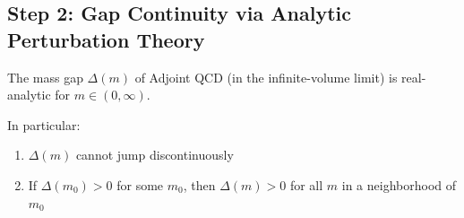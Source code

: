 \subsection{Step 2: Gap Continuity via Analytic Perturbation Theory}
\label{subsec:roadmap3-step2}

\begin{theorem}
\label{thm:gap-analytic-app90}
The mass gap $\Delta(m)$ of Adjoint QCD (in the infinite-volume limit) is 
real-analytic for $m \in (0, \infty)$.

In particular:
\begin{enumerate}[label=(\roman*)]
\item $\Delta(m)$ cannot jump discontinuously
\item If $\Delta(m_0) > 0$ for some $m_0$, then $\Delta(m) > 0$ for all $m$ in 
      a neighborhood of $m_0$
\end{enumerate}
\end{theorem}

